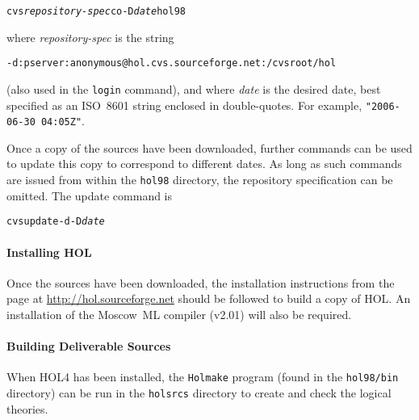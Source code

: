 \documentclass[11pt]{article}
\begin{document}
{\small
\begin{alltt}
   cvs \textit{repository-spec} co -D \textit{date} hol98
\end{alltt}
}

\noindent where \textit{\ttfamily repository-spec} is the string

{\small
\begin{alltt}
   -d:pserver:anonymous@hol.cvs.sourceforge.net:/cvsroot/hol
\end{alltt}
}

\noindent (also used in the \texttt{login} command), and where
\textit{\ttfamily date} is the desired date, best specified as an
ISO~8601 string enclosed in double-quotes.  For example,
\texttt{"2006-06-30 04:05Z"}.

Once a copy of the sources have been downloaded, further commands can
be used to update this copy to correspond to different dates.  As long
as such commands are issued from within the \texttt{hol98} directory,
the repository specification can be omitted.  The update command is

{\small
\begin{alltt}
   cvs update -d -D \textit{date}
\end{alltt}
}

\paragraph{Installing HOL} Once the sources have been downloaded, the
installation instructions from the page at
\url{http://hol.sourceforge.net} should be followed to build a copy of
HOL.  An installation of the Moscow~ML compiler (v2.01) will also be
required.

\paragraph{Building Deliverable Sources}
When HOL4 has been installed, the \texttt{Holmake} program (found in
the \texttt{hol98/bin} directory) can be run in the \texttt{holsrcs}
directory to create and check the logical theories.





\printindex
\end{document}
